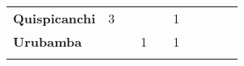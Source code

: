 \begin{tabular}{lccccccccc}
	\textbf{Quispicanchi}                       
	&3			  							    &\cellcolor[HTML]{FCC46C}        &\cellcolor[HTML]{FCC46C}                 &\cellcolor[HTML]{FCC46C}                   &1                   			 &\cellcolor[HTML]{FCC46C}                  
	&\cellcolor[HTML]{FCC46C}                   &\cellcolor[HTML]{FCC46C} 		 &\cellcolor[HTML]{FCC46C}\\
	\textbf{Urubamba}                           
	&\cellcolor[HTML]{FCC46C}                   &\cellcolor[HTML]{FCC46C}        &1                   			       &\cellcolor[HTML]{FCC46C}                   &1                    			 &\cellcolor[HTML]{FCC46C}                     &\cellcolor[HTML]{FCC46C}                   &\cellcolor[HTML]{FCC46C} 		 &\cellcolor[HTML]{FCC46C}\\
	&\multicolumn{1}{l}{}                       &\multicolumn{1}{l}{}            &\multicolumn{1}{l}{}                         
	&\multicolumn{1}{l}{}                       &\multicolumn{1}{l}{}            &\multicolumn{1}{l}{}                        &\multicolumn{1}{l}{}                       &\multicolumn{1}{l}{}            &\multicolumn{1}{l}{}    
\end{tabular}